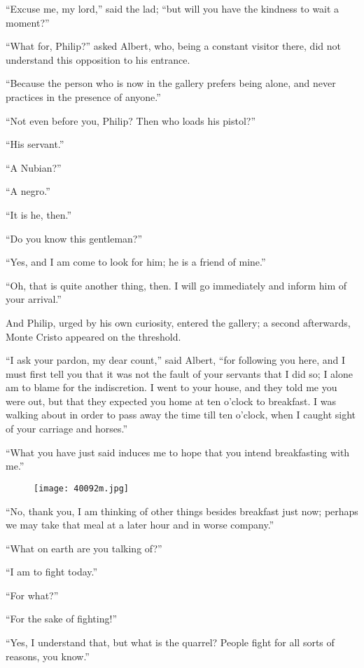 “Excuse me, my lord,” said the lad; “but will you have the kindness to
wait a moment?”

“What for, Philip?” asked Albert, who, being a constant visitor there,
did not understand this opposition to his entrance.

“Because the person who is now in the gallery prefers being alone, and
never practices in the presence of anyone.”

“Not even before you, Philip? Then who loads his pistol?”

“His servant.”

“A Nubian?”

“A negro.”

“It is he, then.”

“Do you know this gentleman?”

“Yes, and I am come to look for him; he is a friend of mine.”

“Oh, that is quite another thing, then. I will go immediately and
inform him of your arrival.”

And Philip, urged by his own curiosity, entered the gallery; a second
afterwards, Monte Cristo appeared on the threshold.

“I ask your pardon, my dear count,” said Albert, “for following you
here, and I must first tell you that it was not the fault of your
servants that I did so; I alone am to blame for the indiscretion. I
went to your house, and they told me you were out, but that they
expected you home at ten o’clock to breakfast. I was walking about in
order to pass away the time till ten o’clock, when I caught sight of
your carriage and horses.”

“What you have just said induces me to hope that you intend
breakfasting with me.”

\begin{figure}[ht]
\texttt{[image: 40092m.jpg]}
\end{figure}

“No, thank you, I am thinking of other things besides breakfast just
now; perhaps we may take that meal at a later hour and in worse
company.”

“What on earth are you talking of?”

“I am to fight today.”

“For what?”

“For the sake of fighting!”

“Yes, I understand that, but what is the quarrel? People fight for all
sorts of reasons, you know.”

